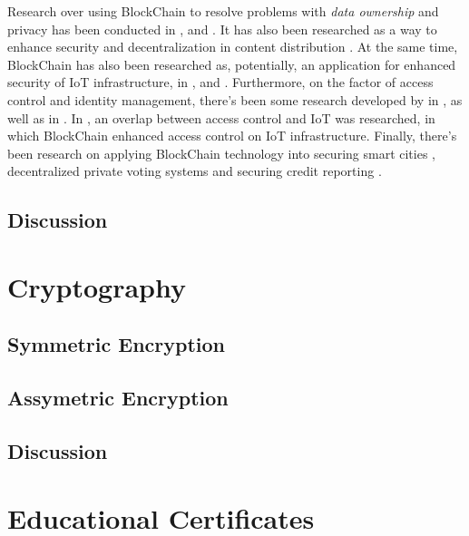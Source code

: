 Research over using BlockChain to resolve problems with \textit{data ownership} and privacy has been conducted in \cite{zyskind_decentralizing_2015}, \cite{liang_provchain:_2017} and \cite{yue_healthcare_2016}. It has also been researched as a way to enhance security and decentralization in content distribution \cite{fotiou_decentralized_2016}. At the same time, BlockChain has also been researched as, potentially, an application for enhanced security of IoT infrastructure, in \cite{dorri_blockchain_2016}, \cite{dorri_blockchain_2017} and \cite{ouaddah_access_2017}. Furthermore, on the factor of access control and identity management, there's been some research developed by \citeauthor{augot_identity_2017} in \cite{augot_identity_2017}, as well as \citeauthor{maesa_blockchain_2017} in \cite{maesa_blockchain_2017}. In \cite{ouaddah_fairaccess:_2017}, an overlap between access control and IoT was researched, in which BlockChain enhanced access control on IoT infrastructure. Finally, there's been research on applying BlockChain technology into securing smart cities \cite{biswas_securing_2016}, decentralized private voting systems \cite{sheer_hardwick_e-voting_2018} and securing credit reporting \cite{kafshdar_goharshady_secure_2018}.

\subsection{Discussion}

\section{Cryptography}
\label{sec:related-crypto}

\subsection{Symmetric Encryption}

\subsection{Assymetric Encryption}

\subsection{Discussion}

\section{Educational Certificates}
\label{sec:related-ec}

